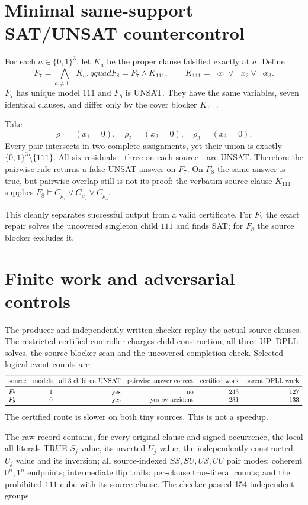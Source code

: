 \documentclass[11pt]{article}
\begin{document}
\section{Minimal same-support SAT/UNSAT countercontrol}
For each $a\in\{0,1\}^3$, let $K_a$ be the proper clause falsified exactly at
$a$.  Define
\[
F_7=\bigwedge_{a\ne111}K_a,qquad
F_8=F_7\wedge K_{111},\qquad
K_{111}=\neg x_1\vee\neg x_2\vee\neg x_3.
\]
$F_7$ has unique model $111$ and $F_8$ is UNSAT.  They have the same variables,
seven identical clauses, and differ only by the cover blocker $K_{111}$.

Take
\[
\rho_1=(x_1=0),\quad \rho_2=(x_2=0),\quad \rho_3=(x_3=0).
\]
Every pair intersects in two complete assignments, yet their union is exactly
$\{0,1\}^3\setminus\{111\}$.  All six residuals---three on each source---are
UNSAT.  Therefore the pairwise rule returns a false UNSAT answer on $F_7$.
On $F_8$ the same answer is true, but pairwise overlap still is not its proof:
the verbatim source clause $K_{111}$ supplies
$F_8\models C_{\rho_1}\vee C_{\rho_2}\vee C_{\rho_3}$.

This cleanly separates successful output from a valid certificate.  For $F_7$
the exact repair solves the uncovered singleton child $111$ and finds SAT; for
$F_8$ the source blocker excludes it.

\section{Finite work and adversarial controls}
The producer and independently written checker replay the actual source clauses.
The restricted certified controller charges child construction, all three
UP--DPLL solves, the source blocker scan and the uncovered completion check.
Selected logical-event counts are:
\[
\begin{array}{lrrrrr}
\toprule
\text{source}&\text{models}&\text{all 3 children UNSAT}&
\text{pairwise answer correct}&\text{certified work}&\text{parent DPLL work}\\\midrule
F_7&1&\text{yes}&\text{no}&243&127\\
F_8&0&\text{yes}&\text{yes by accident}&231&133\\
\bottomrule
\end{array}
\]
The certified route is slower on both tiny sources.  This is not a speedup.

The raw record contains, for every original clause and signed occurrence, the
local all-literals-TRUE $S_j$ value, its inverted $U_j$ value, the independently
constructed $U_j$ value and its inversion; all source-indexed
$SS,SU,US,UU$ pair modes; coherent $0^n,1^n$ endpoints; intermediate flip
trails; per-clause true-literal counts; and the prohibited $111$ cube with its
source clause.  The checker passed 154 independent groups.
\end{document}
